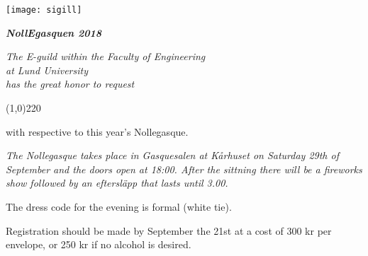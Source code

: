 \documentclass[11pt]{article}
\def\date{2018}
\def\doctitle{NollEgasquen \date}
\begin{document}

    \begin{center}
        \texttt{[image: sigill]}
        \par
        \vspace*{5mm}

        \textit{\textbf{\Large \doctitle}}

        {\it
            The E-guild within the Faculty of Engineering\\ 
            at Lund University\\
            has the great honor to request
            \par \vspace*{8mm}
            \line(1,0){220} 
            \par \vspace*{-1mm}
            with respective to this year's Nollegasque.
        }
    \end{center}

    \vspace*{\baselineskip}

    {\it
    The Nollegasque takes place in Gasquesalen at Kårhuset on Saturday 29th of September and the doors open at 18:00. After the sittning there will be a fireworks show followed by an eftersläpp that lasts until 3.00. 
    
    The dress code for the evening is formal (white tie).

    Registration should be made by September the 21st at a cost of 300 kr per envelope, or 250 kr if no alcohol is desired.
    }
\end{document}
